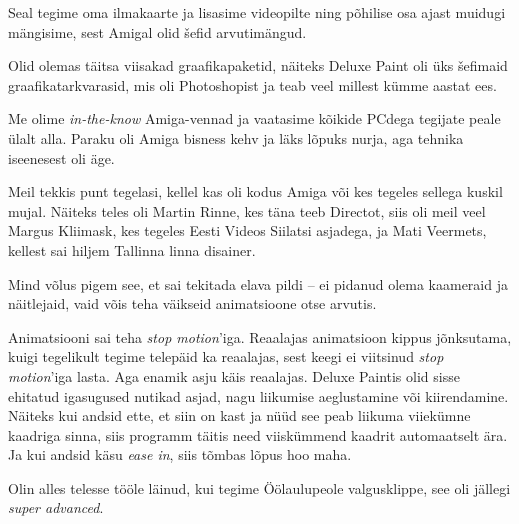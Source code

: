 Seal tegime oma ilmakaarte ja lisasime videopilte ning põhilise osa ajast 
muidugi mängisime, sest Amigal olid šefid arvutimängud. 


Olid olemas täitsa viisakad graafikapaketid, näiteks Deluxe Paint oli üks šefimaid graafikatarkvarasid, mis oli 
Photoshopist ja teab veel millest kümme aastat ees. 

Me olime \emph{in-the-know} Amiga-vennad ja vaatasime kõikide 
PCdega tegijate peale ülalt alla. Paraku oli Amiga bisness kehv ja 
läks lõpuks nurja, aga tehnika iseenesest oli äge. 

Meil tekkis punt tegelasi, kellel kas oli kodus Amiga või kes 
tegeles sellega kuskil mujal. Näiteks teles oli Martin Rinne, kes 
täna teeb Directot,
siis oli meil veel Margus Kliimask, kes tegeles Eesti 
Videos Siilatsi asjadega, ja Mati 
Veermets, kellest sai hiljem Tallinna linna disainer.

Mind võlus pigem see, et sai tekitada 
elava pildi – ei pidanud olema kaameraid ja näitlejaid, vaid 
võis teha väikseid animatsioone otse arvutis.


Animatsiooni sai teha \emph{stop 
motion}'iga. Reaalajas animatsioon kippus jõnksutama, kuigi 
tegelikult tegime telepäid ka reaalajas, sest keegi ei viitsinud 
\emph{stop motion}'iga lasta. Aga enamik asju käis 
reaalajas. Deluxe Paintis olid sisse ehitatud igasugused 
nutikad asjad, nagu liikumise aeglustamine või kiirendamine. Näiteks kui andsid ette, et siin on kast ja nüüd see peab liikuma 
viiekümne kaadriga sinna, siis programm täitis need 
viiskümmend kaadrit automaatselt ära. Ja kui andsid käsu \emph{ease in}, siis 
tõmbas lõpus hoo maha. 

Olin alles telesse tööle läinud, kui tegime Öölaulupeole 
valgusklippe, see oli jällegi \emph{super advanced}.

